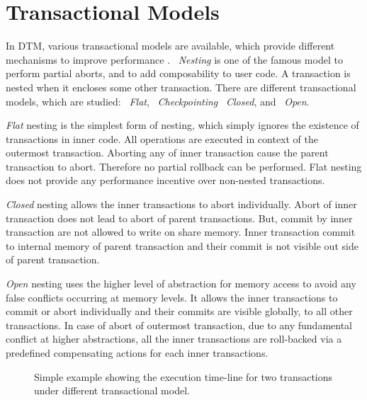\documentclass[12pt,english]{report}
\begin{document}
\section{Transactional Models}

In DTM, various transactional models are available, which provide different mechanisms to improve performance . ~\emph{Nesting} is one of the famous model to perform partial aborts, and to add composability to user code. A transaction is nested when it encloses some other transaction. There are different transactional  models, which are studied: ~\emph{Flat}, ~\emph{Checkpointing} ~\emph{Closed}, and ~\emph{Open}. 

\textit{Flat} nesting is the simplest form of nesting, which simply ignores the existence of transactions in inner code. All operations are executed in context of the outermost transaction. Aborting any of inner transaction cause the parent transaction to abort. Therefore no partial rollback can be performed. Flat nesting does not provide any performance incentive over non-nested transactions.

\textit{Closed} nesting allows the inner transactions to abort individually. Abort of inner transaction does not lead to abort of parent transactions. But, commit by inner transaction are not allowed to write on share memory. Inner transaction commit to internal memory of parent transaction and their commit is not visible out side of parent transaction.

\textit{Open} nesting uses the higher level of abstraction for memory access to avoid any false conflicts occurring at memory levels. It allows the inner transactions to commit or abort individually and their commits are visible globally, to all other transactions. In case of abort of outermost transaction, due to any fundamental conflict at higher abstractions, all the inner transactions are roll-backed via a predefined compensating actions for each inner transactions.

\begin{figure}
\caption{Simple example showing the execution time-line for two transactions under different transactional model.}
\label{Fig:Nesting_example}
\end{figure}
\end{document}
